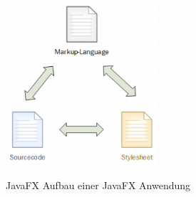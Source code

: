 \begin{figure}[!ht]
  \centering
    \includegraphics[width=0.5\textwidth,keepaspectratio]{images/aufbauJavaFX.png}\\
  \caption{JavaFX Aufbau einer JavaFX Anwendung}
  \label{fig:javafxaufbaufigure}
\end{figure}


\clearpage